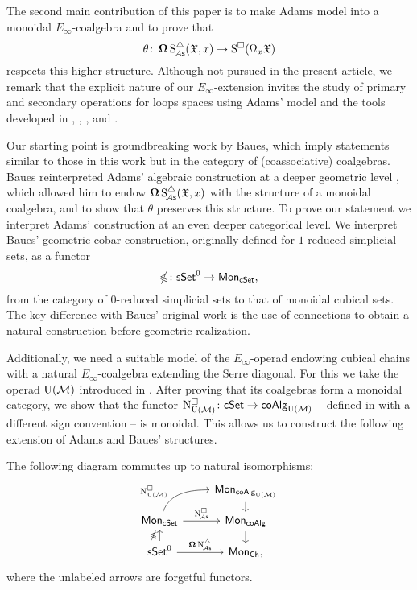 The second main contribution of this paper is to make Adams model into a monoidal $E_\infty$-coalgebra and to prove that
\[
\theta \colon \operatorname{\mathbf{\Omega}} \operatorname{S^{\triangle}_{\!{\mathcal{A}\mathsf{s}}}}(\mathfrak{X}, x) \to \operatorname{S^{\square}}(\Omega_x \mathfrak{X})
\]
respects this higher structure.
Although not pursued in the present article, we remark that the explicit nature of our $E_\infty$-extension invites the study of primary and secondary operations for loops spaces using Adams' model and the tools developed in \cite{medina2021may_st}, \cite{medina2020cartan}, \cite{medina2021adem}, and \cite{medina2021comch}.

Our starting point is groundbreaking work by Baues, which imply statements similar to those in this work but in the category of (coassociative) coalgebras. Baues reinterpreted Adams' algebraic construction at a deeper geometric level \cite{baues1998hopf}, which allowed him to endow $\operatorname{\mathbf{\Omega}} \operatorname{S^{\triangle}_{\!{\mathcal{A}\mathsf{s}}}}(\mathfrak{X}, x)$ with the structure of a monoidal coalgebra, and to show that $\theta$ preserves this structure.
To prove our statement we interpret Adams' construction at an even deeper categorical level.
We interpret Baues' geometric cobar construction, originally defined for $1$-reduced simplicial sets, as a functor
\begin{equation*}
	\operatorname{\mathbb{\Omega}} \colon \mathsf{sSet}^0 \to \mathsf{Mon}_{\mathsf{cSet}},
\end{equation*}
from the category of $0$-reduced simplicial sets to that of monoidal cubical sets.
The key difference with Baues' original work is the use of connections to obtain a natural construction before geometric realization.

Additionally, we need a suitable model of the $E_\infty$-operad endowing cubical chains with a natural $E_\infty$-coalgebra extending the Serre diagonal.
For this we take the operad ${\operatorname{U}(\mathcal{M})}$ introduced in \cite{medina2020prop1}.
After proving that its coalgebras form a monoidal category, we show that the functor $\operatorname{N^{\square}_{{\operatorname{U}(\mathcal{M})}}} \colon \mathsf{cSet} \to \mathsf{coAlg}_{\operatorname{U}(\mathcal{M})}$ -- defined in \cite{medina2022cube_einfty} with a different sign convention -- is monoidal.
This allows us to construct the following extension of Adams and Baues' structures.

\begin{theorem*}
	The following diagram commutes up to natural isomorphisms:
	\[
	\begin{tikzcd} [row sep=small]
		& \Mon_{\coAlg_\UM} \arrow[d] \\
		\Mon_{\cSet} \arrow[ru, "\cchainsUM", out=70, in=180, near start] \arrow[r, "\cchainsA"]
		& \Mon_{\coAlg} \arrow[d] \\
		\sSet^0 \arrow[r, "\cobar \schainsA"] \arrow[u, "\ccobar"]
		& \Mon_{\Ch},
	\end{tikzcd}
	\]
	where the unlabeled arrows are forgetful functors.
\end{theorem*}

